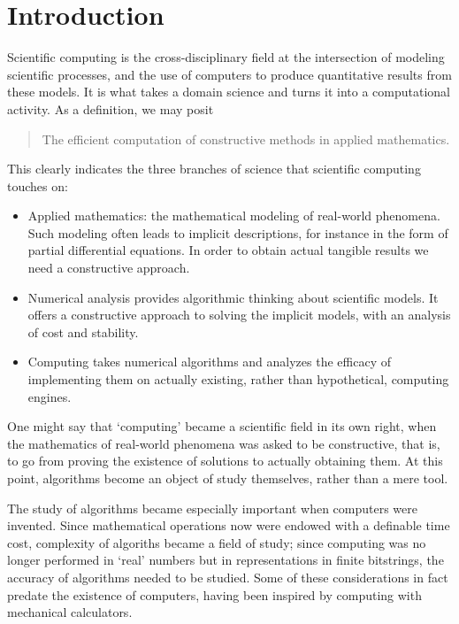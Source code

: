 \pagebreak
\thispagestyle{empty}
\section*{Introduction}

Scientific computing is the cross-disciplinary field at the
intersection of modeling scientific processes, and the use of
computers to produce quantitative results from these models.
It is what takes a domain science and turns it into a computational
activity.
%
As a definition, we may posit
\begin{quote}
  The efficient computation of constructive methods in applied mathematics.
\end{quote}
This clearly indicates the three branches of science that scientific
computing touches on:
\begin{itemize}
\item Applied mathematics: the mathematical modeling of real-world
  phenomena. Such modeling often leads to implicit descriptions, for
  instance in the form of partial differential equations. In order to
  obtain actual tangible results we need a constructive approach.
\item Numerical analysis provides algorithmic thinking about
  scientific models. It offers a constructive approach to solving the
  implicit models, with an analysis of cost and stability.
\item Computing takes numerical algorithms and analyzes the efficacy
  of implementing them on actually existing, rather than hypothetical,
  computing engines.
\end{itemize}

One might say that `computing' became a scientific field in its own
right, when the mathematics of real-world phenomena was asked to be
constructive, that is, to go from proving the existence of solutions
to actually obtaining them. At this point, algorithms become an object
of study themselves, rather than a mere tool.

The study of algorithms became especially important when computers were
invented. Since mathematical operations now were endowed with a
definable time cost, complexity of algoriths became a field of study;
since computing was no longer performed in `real' numbers but in
representations in finite bitstrings, the accuracy of algorithms
needed to be studied. Some of these considerations in fact predate the
existence of computers, having been inspired by computing with
mechanical calculators.

